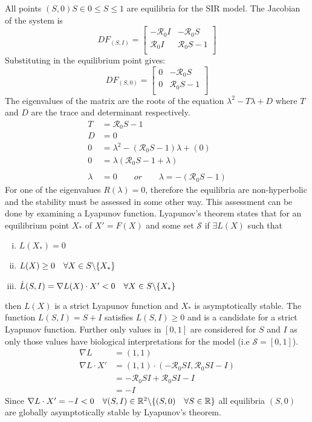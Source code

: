 All points $(S,0) S \in 0 \leq S \leq 1$ are equilibria for the SIR model.
The Jacobian of the system is
$$ DF_{(S,I)} =
\begin{bmatrix}
    -{\mathcal R_0}I & -{\mathcal R_0}S\\
     {\mathcal R_0}I &  {\mathcal R_0}S - 1\\
\end{bmatrix} $$
Substituting in the equilibrium point gives:
$$ DF_{(S,0)} =
\begin{bmatrix}
    0 & -{\mathcal R_0}S\\
    0 &  {\mathcal R_0}S - 1\\
\end{bmatrix} $$
The eigenvalues of the matrix are the roots of the equation $\lambda^2 - T\lambda + D$ where $T$ and $D$ are the trace and determinant respectively.
\begin{align*}
    T &= {\mathcal R_0}S - 1\\
    D &= 0\\
    0 &= \lambda^2 - ({\mathcal R_0}S - 1)\lambda + (0)\\
    0 &= \lambda({\mathcal R_0}S - 1 + \lambda)\\\\
    \lambda &= 0\qquad or\qquad \lambda = -({\mathcal R_0}S - 1)
\end{align*}
For one of the eigenvalues $R(\lambda) = 0$, therefore the equilibria are non-hyperbolic and the stability must be assessed in some other way.
This assessment can be done by examining a Lyapunov function.
Lyapunov's theorem states that for an equilibrium point $X_*$ of $X'=F(X)$ and some set ${\mathcal S}$ if $\exists L(X)$ such that
\begin{enumerate}[(i)]
    \item $L(X_*) = 0$
    \item $L(X) \geq 0\quad \forall X \in S\char`\\ \{X_*\}$
    \item $\dot{L}(S,I) = \nabla L(X) \cdot X' < 0 \quad \forall X \in S\char`\\ \{X_*\}$
\end{enumerate}
then $L(X)$ is a strict Lyapunov function and $X_*$ is asymptotically stable.
The function $L(S,I) = S + I$ satisfies $L(S,I) \geq 0$ and is a candidate for a strict Lyapunov function.
Further only values in $[0,1]$ are considered for $S$ and $I$ as only those values have biological interpretations for the model (i.e ${\mathcal S} = [0,1]$).
\begin{align*}
    \nabla L &= (1,1)\\
    \nabla L \cdot X' &= (1,1)\cdot(-{\mathcal R_0}SI,{\mathcal R_0}SI-I)\\
    &=-{\mathcal R_0}SI + {\mathcal R_0}SI-I\\
    &=-I
\end{align*}
Since $\nabla L \cdot X' = -I < 0\quad \forall (S,I) \in \mathbb{R}^2\char`\\ \{(S,0)\quad \forall S \in \mathbb{R}\}$ all equilibria $(S,0)$ are globally asymptotically stable by Lyapunov's theorem.
